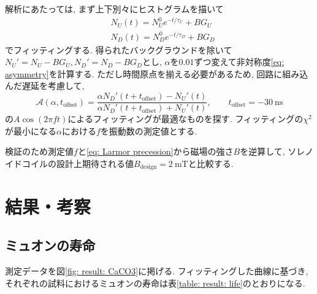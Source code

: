 \documentclass[dvipdfmx]{jsarticle}
\begin{document}
解析にあたっては, まず上下別々にヒストグラムを描いて
\begin{equation}
    \label{eq: method: rough fitting of spin polarization by exp}
    \begin{split}
        &N_U(t)=N_U^0e^{-t/\tau_U}+BG_U
        \\
        &N_D(t)=N_D^0e^{-t/\tau_D}+BG_D
    \end{split}
\end{equation}
でフィッティングする.
得られたバックグラウンドを除いて$N_U'=N_U-BG_U, N_D'=N_D-BG_D$とし, $\alpha$を$0.01$ずつ変えて非対称度\eqref{eq: asymmetry}を計算する.
ただし時間原点を揃える必要があるため, 回路に組み込んだ遅延を考慮して,
\begin{equation}
    \label{eq: method: fit asymmetry}
    \mathscr{A}(\alpha,t_{\text{offset}})
    =
    \frac{\alpha N_D'(t+t_{\text{offset}})-N_U'(t)}{\alpha N_D'(t+t_{\text{offset}})+N_U'(t)}
    ,
    \qquad
    t_{\text{offset}}=-\SI{30}{\nano\second}
\end{equation}
の$A\cos(2\pi ft)$によるフィッティングが最適なものを探す.
フィッティングの$\chi^2$が最小になる$\alpha$における$f$を振動数の測定値とする.

検証のため測定値$f$と\eqref{eq: Larmor precession}から磁場の強さ$B$を逆算して, ソレノイドコイルの設計上期待される値$B_\text{design}=\SI{2}{\milli\tesla}$と比較する.


\section{結果・考察}

\subsection{ミュオンの寿命}

測定データを図\ref{fig: result: CaCO3}に掲げる.
フィッティングした曲線に基づき, それぞれの試料におけるミュオンの寿命は表\ref{table: result: life}のとおりになる.
\end{document}
